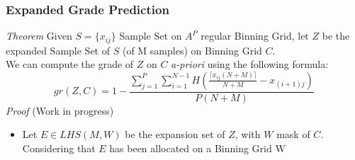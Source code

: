 \documentclass{article}
\begin{document}
\subsubsection{Expanded Grade Prediction}
\textit{Theorem}\; Given $S = \{x_{ij}\}$ Sample Set on $A^P$ regular Binning Grid, let $Z$ be the expanded Sample Set of $S$ (of M samples) on Binning Grid $C$. \\
We can compute the grade of $Z$ on $C$ \textit{a-priori} using the following formula:
\begin{equation}
gr(Z, C) = 1 - \frac{\sum^P_{j=1} \sum^{N-1}_{i=1} H(\frac{\lceil x_{ij}(N+M) \rceil}{N+M} - x_{(i+1)j})}{P(N+M)}
\end{equation}
\textit{Proof}\; (Work in progress)
\begin{itemize}[label=$\bullet$]
\item Let $E \in LHS(M, W)$ be the expansion set of $Z$, with $W$ mask of $C$. \\
Considering that $E$ has been allocated on a Binning Grid W 

\end{itemize}
\end{document}
